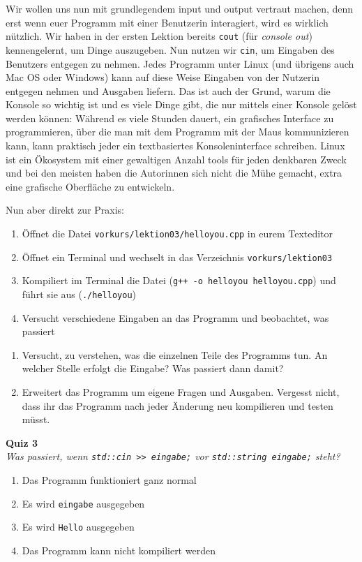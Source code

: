 Wir wollen uns nun mit grundlegendem input und output vertraut machen, denn
erst wenn euer Programm mit einer Benutzerin interagiert, wird es wirklich
nützlich. Wir haben in der ersten Lektion bereits \texttt{cout} (für
\emph{console out}) kennengelernt, um Dinge auszugeben. Nun nutzen wir
\texttt{cin}, um Eingaben des Benutzers entgegen zu nehmen. Jedes Programm
unter Linux (und übrigens auch Mac OS oder Windows) kann auf diese Weise
Eingaben von der Nutzerin entgegen nehmen und Ausgaben liefern. Das ist auch
der Grund, warum die Konsole so wichtig ist und es viele Dinge gibt, die nur
mittels einer Konsole gelöst werden können: Während es viele Stunden dauert,
ein grafisches Interface zu programmieren, über die man mit dem Programm mit
der Maus kommunizieren kann, kann praktisch jeder ein textbasiertes
Konsoleninterface schreiben. Linux ist ein Ökosystem mit einer gewaltigen
Anzahl tools für jeden denkbaren Zweck und bei den meisten haben die Autorinnen
sich nicht die Mühe gemacht, extra eine grafische Oberfläche zu entwickeln.

Nun aber direkt zur Praxis:

\begin{praxis}
	\begin{enumerate}
		\item Öffnet die Datei \texttt{vorkurs/lektion03/helloyou.cpp} in eurem Texteditor
		\item Öffnet ein Terminal und wechselt in das Verzeichnis \texttt{vorkurs/lektion03}
		\item Kompiliert im Terminal die Datei (\texttt{g++ -o helloyou
			      helloyou.cpp}) und führt sie aus (\texttt{./helloyou})
		\item Versucht verschiedene Eingaben an das Programm und beobachtet, was passiert
	\end{enumerate}

\end{praxis}

\begin{spiel}
	\begin{enumerate}
		\item Versucht, zu verstehen, was die einzelnen Teile des Programms tun. An
		      welcher Stelle erfolgt die Eingabe? Was passiert dann damit?
		\item Erweitert das Programm um eigene Fragen und Ausgaben. Vergesst nicht,
		      dass ihr das Programm nach jeder Änderung neu kompilieren und testen
		      müsst.
	\end{enumerate}
\end{spiel}

\textbf{Quiz 3}\\
\textit{Was passiert, wenn \texttt{std::cin >> eingabe;} vor \texttt{std::string eingabe;} steht?}
\begin{enumerate}[label=\alph*)]
	\item Das Programm funktioniert ganz normal
	\item Es wird \texttt{eingabe} ausgegeben
	\item Es wird \texttt{Hello} ausgegeben
	\item Das Programm kann nicht kompiliert werden
\end{enumerate}

